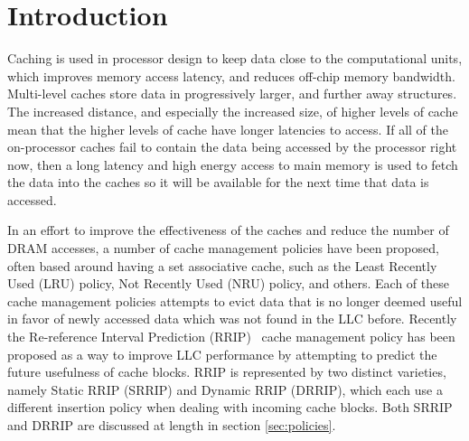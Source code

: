 \section{Introduction}

Caching is used in processor design to keep data close to the
computational units, which improves memory access latency, and reduces
off-chip memory bandwidth.  Multi-level
caches store data in progressively larger,
and further away structures.  The increased distance, and especially
the increased size, of higher levels of cache mean that the higher
levels of cache have longer latencies to access.  If all of the
on-processor caches fail to contain the data being accessed by the
processor right now, then a long latency and high energy access to
main memory is used to fetch the data into the caches so it will be
available for the next time that data is accessed.


In an effort to improve the effectiveness of the caches and reduce the
number of DRAM accesses, a number of cache management policies have
been proposed, often based around having a set associative cache, such
as the Least Recently Used (LRU) policy, Not Recently Used
(NRU) policy, and others.  Each of these cache management policies
attempts to
evict data that is no longer deemed useful in favor of newly accessed
data which was not found in the LLC before.  Recently the
Re-reference Interval Prediction (RRIP)~\cite{jaleeltheobald10} cache
management policy has
been proposed as a way to improve LLC performance by attempting to
predict the future usefulness of cache blocks.  RRIP is represented by
two distinct varieties, namely Static RRIP (SRRIP) and Dynamic RRIP
(DRRIP), which
each use a different insertion policy when dealing with incoming
cache blocks.  Both SRRIP and DRRIP are discussed at length in section
\ref{sec:policies}.

